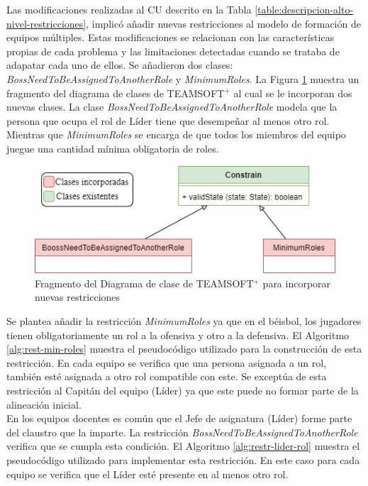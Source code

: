 Las modificaciones realizadas al CU descrito en la Tabla \ref{table:descripcion-alto-nivel-restricciones}, implicó añadir nuevas restricciones al modelo de formación de equipos múltiples. Estas modificaciones se relacionan con las características propias de cada problema y las limitaciones detectadas cuando se trataba de adapatar cada uno de ellos. Se añadieron dos clases: \textit{BossNeedToBeAssignedToAnotherRole} y \textit{MinimumRoles}. La Figura \ref{fig:diagrama-clases-modificado} muestra un fragmento del diagrama de clases de TEAMSOFT$^+$ al cual se le incorporan dos nuevas clases. La clase \textit{BossNeedToBeAssignedToAnotherRole} modela que la persona que ocupa el rol de Líder tiene que desempeñar al menos otro rol. Mientras que \textit{MinimumRoles} se encarga de que todos los miembros del equipo juegue una cantidad mínima obligatoria de roles. 

\begin{figure}[H]
	\centering
	\includegraphics[width=.7\textwidth]{figuras/diagramas-clases-a-incorporar.png}
	\caption{Fragmento del Diagrama de clase de TEAMSOFT$^+$ para incorporar nuevas restricciones} \label{fig:diagrama-clases-modificado}
\end{figure}

{\color{red}
Se plantea añadir la restricción \textit{MinimumRoles} ya que en el béisbol, los jugadores tienen obligatoriamente un rol a la ofensiva y otro a la defensiva. El Algoritmo \ref{alg:rest-min-roles} muestra el pseudocódigo utilizado para la construcción de esta restricción. En cada equipo se verifica que una persona asignada a un rol, también esté asignada a otro rol compatible con este. Se exceptúa de esta restricción al Capitán del equipo (Líder) ya que este puede no formar parte de la alineación inicial. \\

En los equipos docentes es común que el Jefe de asignatura (Líder) forme parte del claustro que la imparte. La restricción \textit{BossNeedToBeAssignedToAnotherRole} verifica que se cumpla esta condición. El Algoritmo \ref{alg:restr-lider-rol} muestra el pseudocódigo utilizado para implementar esta restricción. En este caso para cada equipo se verifica que el Líder esté presente en al menos otro rol. } \vspace{1cm}

